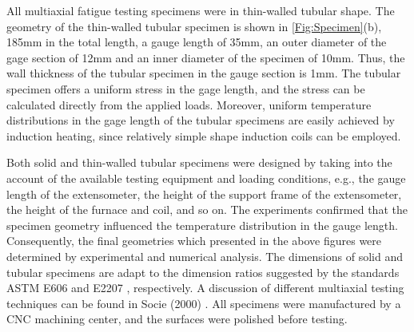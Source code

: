 All multiaxial fatigue testing specimens were in thin-walled tubular shape.
The geometry of the thin-walled tubular specimen is shown in \ref{Fig:Specimen}(b), 185mm in the total length, a gauge length of 35mm, an outer diameter of the gage section of 12mm and an inner diameter of the specimen of 10mm.
Thus, the wall thickness of the tubular specimen in the gauge section is 1mm.
The tubular specimen offers a uniform stress in the gage length, and the stress can be calculated directly from the applied loads.
Moreover, uniform temperature distributions in the gage length of the tubular specimens are easily achieved by induction heating, since relatively simple shape induction coils can be employed.

Both solid and thin-walled tubular specimens were designed by taking into the account of the available testing equipment and loading conditions, e.g., the gauge length of the extensometer, the height of the support frame of the extensometer, the height of the furnace and coil, and so on.
The experiments confirmed that the specimen geometry influenced the temperature distribution in the gauge length.
Consequently, the final geometries which presented in the above figures were determined by experimental and numerical analysis.
The dimensions of solid and tubular specimens are adapt to the dimension ratios suggested by the standards ASTM E606 \cite{astm1998standard} and E2207 \cite{standard2007e2207}, respectively.
A discussion of different multiaxial testing techniques can be found in Socie (2000) \cite{socie2000multiaxial}.
All specimens were manufactured by a CNC machining center, and the surfaces were polished before testing.




